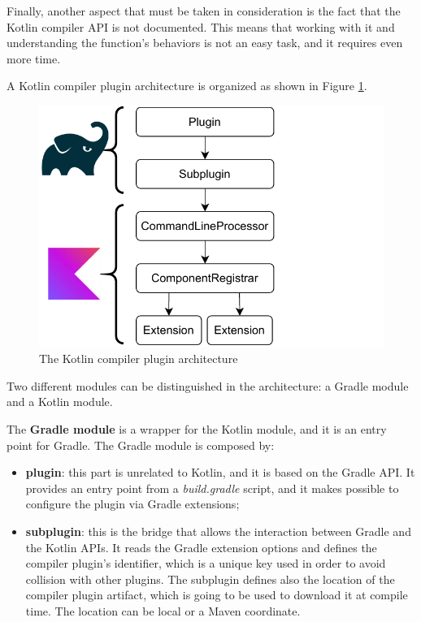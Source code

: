 Finally, another aspect that must be taken in consideration is the fact that the Kotlin compiler API is not documented. This means that working with it and understanding the function's behaviors is not an easy task, and it requires even more time.

A Kotlin compiler plugin architecture is organized as shown in Figure \ref{fig:kotlin_compiler_plugin_architecture}.

\begin{figure}[!ht]
    \centering
    \includegraphics[scale=1]{document/chapters/2-metaprogramming/images/kotlin_compiler_plugin_architecture.pdf}
    \caption{The Kotlin compiler plugin architecture \cite{compiler_plugins_jetbrains}}
    \label{fig:kotlin_compiler_plugin_architecture}
\end{figure}

Two different modules can be distinguished in the architecture: a Gradle module and a Kotlin module.

The \textbf{Gradle module} is a wrapper for the Kotlin module, and it is an entry point for Gradle. The Gradle module is composed by:
\begin{itemize}
    \item \textbf{plugin}: this part is unrelated to Kotlin, and it is based on the Gradle API. It provides an entry point from a \textit{build.gradle} script, and it makes possible to configure the plugin via Gradle extensions;
    \item \textbf{subplugin}: this is the bridge that allows the interaction between Gradle and the Kotlin APIs. It reads the Gradle extension options and defines the compiler plugin's identifier, which is a unique key used in order to avoid collision with other plugins. The subplugin defines also the location of the compiler plugin artifact, which is going to be used to download it at compile time. The location can be local or a Maven coordinate.
\end{itemize}

